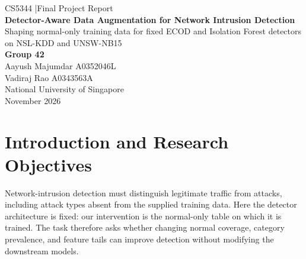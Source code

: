 \documentclass[10pt,a4paper]{article}
\begin{document}
\hypersetup{pageanchor=false}\begin{titlepage}
\centering\vspace*{2.2cm}
{\large CS5344 \quad|\quad Final Project Report}\\[1.2cm]
{\Huge\bfseries\color{navy} Detector-Aware Data Augmentation for Network Intrusion Detection}\\[0.4cm]
{\Large Shaping normal-only training data for fixed ECOD and Isolation Forest detectors on NSL-KDD and UNSW-NB15}\\[2cm]
{\Large \textbf{Group 42}}\\[0.6cm]
Aayush Majumdar \quad A0352046L\\
Vadiraj Rao \quad A0343563A\\[2cm]
National University of Singapore\\[0.3cm] November 2026
\end{titlepage}\setcounter{page}{1}\hypersetup{pageanchor=true}
\begin{abstract}\noindent
We generate normal-only training data for fixed ECOD and Isolation Forest detectors on two network-intrusion datasets. The supplied NSL-KDD and UNSW-NB15 tables contain 30\,000 and 50\,000 labeled records; the required outputs contain 40\,000 and 70\,000 normal records. Our objective is downstream attack-ranking utility rather than distributional fidelity. A shared pipeline combines configurable generation, category weighting, duplicate jitter, tail expansion, domain constraints, and feature neutralization. UNSW-NB15 benefits from contrastive normal reweighting and conditional Gaussian copulas with discriminative variance scaling. NSL-KDD benefits from retaining scrubbed normal observations and supplementing them with copulas fitted within SILK-style k-FreqItems clusters. On the public leaderboard, scores rise from 0.4210 to 0.61452 for UNSW-NB15 and from 0.92919 to 0.93734 for NSL-KDD. The selected submissions achieve final hidden AUPRC of \textbf{0.68508} and \textbf{0.95247}, respectively. Negative experiments show that additional generator complexity or stronger balancing does not reliably improve detector utility. We provide pseudocode, ablations, validation limitations, and lessons for reproducible distribution engineering.
\end{abstract}
\section{Introduction and Research Objectives}
Network-intrusion detection must distinguish legitimate traffic from attacks, including attack types absent from the supplied training data. Here the detector architecture is fixed: our intervention is the normal-only table on which it is trained. The task therefore asks whether changing normal coverage, category prevalence, and feature tails can improve detection without modifying the downstream models.
\end{document}
